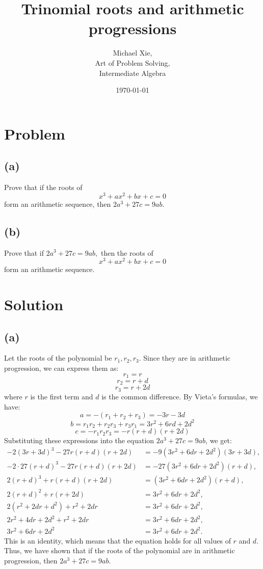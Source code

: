 \documentclass{article}
\title{Trinomial roots and arithmetic progressions}
\author{Michael Xie, \\
        Art of Problem Solving, \\
        Intermediate Algebra}
\date{\today}
\begin{document}
\maketitle

\section{Problem}
\subsection{(a)}

Prove that if the roots of
\[x^3 + ax^2 + bx + c = 0\]
form an arithmetic sequence, then $2a^3 + 27c = 9ab.$

\subsection{(b)}
Prove that if $2a^3 + 27c = 9ab,$ then the roots of
\[x^3 + ax^2 + bx + c = 0\]
form an arithmetic sequence.

\section{Solution}
\subsection{(a)}
Let the roots of the polynomial be $r_1, r_2, r_3$. Since they are in arithmetic progression, we can express them as:
\[r_1 = r\]
\[r_2 = r + d\]
\[r_3 = r + 2d\]
where $r$ is the first term and $d$ is the common difference. By Vieta's formulas, we have:
\[
a = -(r_1 + r_2 + r_3) = -3r - 3d
\]
\[
b = r_1r_2 + r_2r_3 + r_3r_1 = 3r^2 + 6rd + 2d^2
\]
\[
c = -r_1r_2r_3 = -r(r + d)(r + 2d)
\]
Substituting these expressions into the equation $2a^3 + 27c = 9ab$, we get:
\begin{align} \label{eq:part_a}
    -2(3r + 3d)^3 - 27r(r + d)(r + 2d) &= -9(3r^2 + 6dr + 2d^2)(3r + 3d), \\
    -2 \cdot 27(r + d) ^3 - 27r(r + d)(r + 2d) &= -27(3r^2 + 6dr + 2d^2)(r + d), \\
    2(r + d)^3 + r(r + d)(r + 2d) &= (3r^2 + 6dr + 2d^2)(r + d), \\
    2(r + d)^2 + r(r + 2d) &= 3r^2 + 6dr + 2d^2, \\
    2(r^2 + 2dr + d^2) + r^2 + 2dr &= 3r^2 + 6dr + 2d^2, \\
    2r^2 + 4dr + 2d^2 + r^2 + 2dr &= 3r^2 + 6dr + 2d^2, \\
    3r^2 + 6dr + 2d^2 &= 3r^2 + 6dr + 2d^2.
\end{align}
This is an identity, which means that the equation holds for all values of $r$ and $d$. Thus, we have shown that if the roots of the polynomial are in arithmetic progression, then $2a^3 + 27c = 9ab$.
\end{document}
